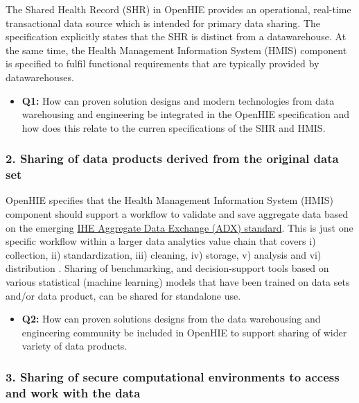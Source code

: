 \documentclass[
  authoryear]{elsarticle}
\providecommand{\tightlist}{%
  \setlength{\itemsep}{0pt}\setlength{\parskip}{0pt}}\usepackage{longtable,booktabs,array}
\begin{document}
The Shared Health Record (SHR) in OpenHIE provides an operational,
real-time transactional data source which is intended for primary data
sharing. The specification explicitly states that the SHR is distinct
from a datawarehouse. At the same time, the Health Management
Information System (HMIS) component is specified to fulfil functional
requirements that are typically provided by datawarehouses.

\begin{itemize}
\tightlist
\item
  \textbf{Q1:} How can proven solution designs and modern technologies
  from data warehousing and engineering be integrated in the OpenHIE
  specification and how does this relate to the curren specifications of
  the SHR and HMIS.
\end{itemize}

\subsubsection{2. Sharing of data products derived from the original
data
set}\label{sharing-of-data-products-derived-from-the-original-data-set}

OpenHIE specifies that the Health Management Information System (HMIS)
component should support a workflow to validate and save aggregate data
based on the emerging
\href{https://www.ihe.net/uploadedFiles/Documents/QRPH/IHE_QRPH_Suppl_ADX.pdf}{IHE
Aggregate Data Exchange (ADX) standard}. This is just one specific
workflow within a larger data analytics value chain that covers i)
collection, ii) standardization, iii) cleaning, iv) storage, v) analysis
and vi) distribution \citep{curry2016big}. Sharing of benchmarking, and
decision-support tools based on various statistical (machine learning)
models that have been trained on data sets and/or data product, can be
shared for standalone use.

\begin{itemize}
\tightlist
\item
  \textbf{Q2:} How can proven solutions designs from the data
  warehousing and engineering community be included in OpenHIE to
  support sharing of wider variety of data products.
\end{itemize}

\subsubsection{3. Sharing of secure computational environments to access
and work with the
data}\label{sharing-of-secure-computational-environments-to-access-and-work-with-the-data}
\end{document}
